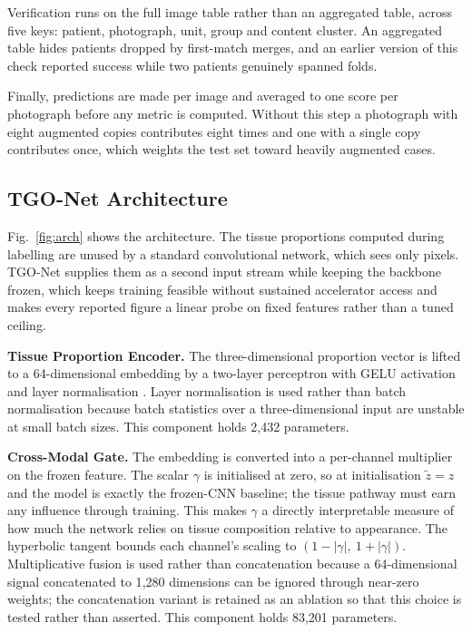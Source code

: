 Verification runs on the full image table rather than an aggregated table,
across five keys: patient, photograph, unit, group and content cluster. An
aggregated table hides patients dropped by first-match merges, and an
earlier version of this check reported success while two patients genuinely
spanned folds.

Finally, predictions are made per image and averaged to one score per
photograph before any metric is computed. Without this step a photograph
with eight augmented copies contributes eight times and one with a single
copy contributes once, which weights the test set toward heavily augmented
cases.

\subsection{TGO-Net Architecture}

Fig.~\ref{fig:arch} shows the architecture. The tissue proportions computed
during labelling are unused by a standard convolutional network, which sees
only pixels. TGO-Net supplies them as a second input stream while keeping
the backbone frozen, which keeps training feasible without sustained
accelerator access and makes every reported figure a linear probe on fixed
features rather than a tuned ceiling.

\textbf{Tissue Proportion Encoder.} The three-dimensional proportion vector
is lifted to a 64-dimensional embedding by a two-layer perceptron with GELU
activation \cite{hendrycks2016} and layer normalisation \cite{ba2016}.
Layer normalisation is used rather than batch normalisation because batch
statistics over a three-dimensional input are unstable at small batch
sizes. This component holds 2{,}432 parameters.

\textbf{Cross-Modal Gate.} The embedding is converted into a per-channel
multiplier on the frozen feature. The scalar $\gamma$ is initialised at
zero, so at initialisation $\tilde{z} = z$ and the model is exactly the
frozen-CNN baseline; the tissue pathway must earn any influence through
training. This makes $\gamma$ a directly interpretable measure of how much
the network relies on tissue composition relative to appearance. The
hyperbolic tangent bounds each channel's scaling to
$(1 - |\gamma|,\ 1 + |\gamma|)$. Multiplicative fusion is used rather than
concatenation because a 64-dimensional signal concatenated to 1{,}280
dimensions can be ignored through near-zero weights; the concatenation
variant is retained as an ablation so that this choice is tested rather
than asserted. This component holds 83{,}201 parameters.

